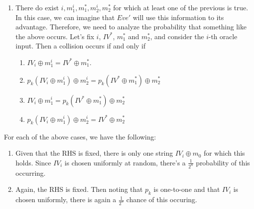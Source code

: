 \documentclass{article}
\begin{document}
\begin{enumerate}
\begin{enumerate}[,label=\alph*.]
\begin{enumerate}[noitemsep,topsep=\mdcompacttopsep]
\item{}
There do exist $i,m^i_1,m_1^*,m^i_2,m_2^*$ for which at least one of the previous is true. In 
this case, we can imagine that $Eve'$ will use this information to its advantage. Therefore, we 
need to analyze the probability that something like the above occurs. Let's fix $i$, $IV^*$, $m_1^*$
and $m_2^*$, and consider the $i$-th oracle input. Then a collision occurs if and only if%

\begin{enumerate}[noitemsep,topsep=\mdcompacttopsep,label=\alph*.]%

\item{}$IV_i \oplus m^i_1 = IV^* \oplus m_1^*$.%

\item{}$p_k(IV_i \oplus m^i_1) \oplus m^i_2 = p_k(IV^* \oplus m_1^*) \oplus m_2^*$%

\item{}$IV_i \oplus m^i_1 = p_k(IV^* \oplus m_1^*) \oplus m_2^*$%

\item{}$p_k(IV_i \oplus m^i_1) \oplus m^i_2  = IV^* \oplus m_2^*$%
\end{enumerate}%
\end{enumerate}%

For each of the above cases, we have the following:%

\begin{enumerate}[noitemsep,topsep=\mdcompacttopsep,label=\alph*.]%

\item{}Given that the RHS is fixed, there is only one string $IV_i \oplus m_0$ for which this holds.
Since $IV_i$ is chosen uniformly at random, there's a $\frac{1}{2^n}$ probability of this occurring.%

\item{}Again, the RHS is fixed. Then noting that $p_k$ is one-to-one and that $IV_i$ is chosen uniformly,
there is again a $\frac{1}{2^n}$ chance of this occuring.%


\end{enumerate}
\end{enumerate}
\end{enumerate}
\end{document}
